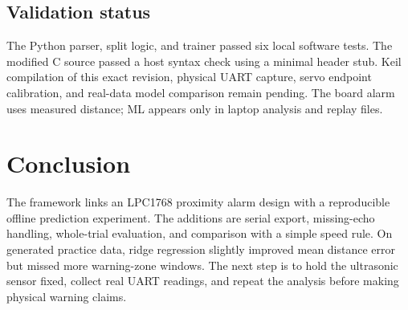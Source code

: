 \documentclass[conference]{IEEEtran}
\begin{document}
\subsection{Validation status}
The Python parser, split logic, and trainer passed six local software tests. The modified C source passed a host syntax check using a minimal header stub. Keil compilation of this exact revision, physical UART capture, servo endpoint calibration, and real-data model comparison remain pending. The board alarm uses measured distance; ML appears only in laptop analysis and replay files.
\section{Conclusion}
The framework links an LPC1768 proximity alarm design with a reproducible offline prediction experiment. The additions are serial export, missing-echo handling, whole-trial evaluation, and comparison with a simple speed rule. On generated practice data, ridge regression slightly improved mean distance error but missed more warning-zone windows. The next step is to hold the ultrasonic sensor fixed, collect real UART readings, and repeat the analysis before making physical warning claims.
\end{document}
